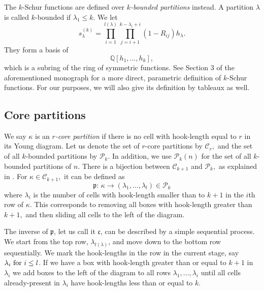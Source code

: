 \documentclass[11pt]{amsart}
\newcommand{\tn}[1]{\textnormal{#1}}
\begin{document}
 The $k$-Schur functions are defined over \textit{$k$-bounded partitions} instead. A partition $\lambda$ is called $k$-bounded if $\lambda_1 \leq k.$ We let 
 \begin{equation} \label{deter}
     s_{\lambda}^{(k)}= \prod_{i=1}^{l(\lambda)} \prod_{j=i+1}^{k-\lambda_i+i} (1-R_{ij}) h_{\lambda}.
 \end{equation}
 They form a basis of 
\[\mathbb{Q}[h_1,\ldots,h_k],\]
which is a subring of the ring of symmetric functions. See Section $3$ of the aforementioned monograph \cite{LLMSSZ14} for a more direct, parametric definition of $k$-Schur functions. For our purposes, we will also give its definition by tableaux as well. 


\subsection{Core partitions} \label{sec:core}

 We say $\kappa$ is an \textit{$r$-core partition} if there is no cell with hook-length equal to $r$ in its Young diagram. Let us denote the set of $r$-core partitions by $\mathcal{C}_{r},$ and the set of all $k$-bounded partitions by $\mathcal{P}_k$. In addition, we use  $\mathcal{P}_k(n)$ for the set of all $k$-bounded partitions of $n.$ There is a bijection between $\mathcal{C}_{k+1}$ and $\mathcal{P}_k,$ as explained in \cite{LM05}. For $\kappa \in \mathcal{C}_{k+1},$ it can be defined as
\[ \mathfrak{p}: \, \kappa \rightarrow (\lambda_1,\ldots,\lambda_l) \in \mathcal{P}_k\]
where $\lambda_i$ is the number of cells with hook-length smaller than 
to $k+1$ in the $i$th row 
of $\kappa.$ This corresponds to removing all boxes with hook-length greater than $k+1,$ and then sliding all cells to the left of the diagram. 

The inverse of $\mathfrak{p}$, let us call it $\mathfrak{c}$, can be described by a simple sequential process. We start from the top row, $\lambda_{l(\lambda)}$, and move down to the bottom row sequentially. We mark the hook-lengths in the row in the current stage, say $\lambda_i \tn{ for } i\leq l$. If we have a box with hook-length greater than or equal to $k+1$ in $\lambda_i$ we add boxes to the left of the diagram to all rows $\lambda_1,\ldots,\lambda_i$ until all cells already-present in $\lambda_i$ have hook-lengths less than or equal to $k.$ 
\end{document}
